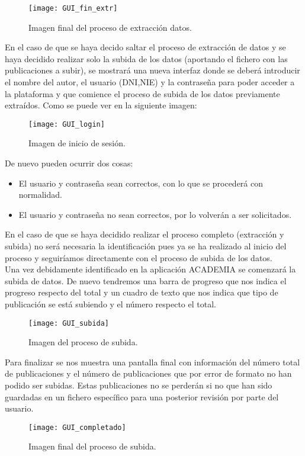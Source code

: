 		\begin{figure}[H]
		\centering
		\texttt{[image: GUI\_fin\_extr]}
		\caption{Imagen final del proceso de extracción datos.}
		\end{figure}
		
En el caso de que se haya decido saltar el proceso de extracción de datos y se haya decidido realizar solo la subida de los datos (aportando el fichero con las publicaciones a subir), se mostrará una nueva interfaz donde se deberá introducir el nombre del autor, el usuario (DNI,NIE) y la contraseña para poder acceder a la plataforma y que comience el proceso de subida de los datos previamente extraídos. Como se puede ver en la siguiente imagen:
			
		\begin{figure}[H]
		\centering
		\texttt{[image: GUI\_login]}
		\caption{Imagen de inicio de sesión.}
		\end{figure}
	

De nuevo pueden ocurrir dos cosas:
\begin{itemize}
	\item El usuario y contraseña sean correctos, con lo que se procederá con normalidad.
	\item El usuario y contraseña no sean correctos, por lo volverán a ser solicitados.
\end{itemize}
En el caso de que se haya decidido realizar el proceso completo (extracción y subida) no será necesaria la identificación pues ya se ha realizado al inicio del proceso y seguiríamos directamente con el proceso de subida de los datos. \\

Una vez debidamente identificado en la aplicación ACADEMIA se comenzará la subida de datos. De nuevo tendremos una barra de progreso que nos indica el progreso respecto del total y un cuadro de texto que nos indica que tipo de publicación se está subiendo y el número respecto el total.

		\begin{figure}[H]
		\centering
		\texttt{[image: GUI\_subida]}
		\caption{Imagen del proceso de subida.}
		\end{figure}


Para finalizar se nos muestra una pantalla final con información del número total de publicaciones y el número de publicaciones que por error de formato no han podido ser subidas. Estas publicaciones no se perderán si no que han sido guardadas en un fichero específico para una posterior revisión por parte del usuario.

		\begin{figure}[H]
		\centering
		\texttt{[image: GUI\_completado]}
		\caption{Imagen final del proceso de subida.}
		\end{figure}

